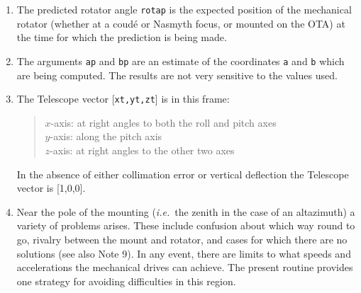 \documentclass[12pt,fleqn,twoside]{article}
\renewcommand{\_}{{\tt\char'137}}     %
\newcommand{\radec}     {$[\,\alpha,\delta\,]$}
\newcommand{\hadec}     {$[\,h,\delta\,]$}
\newcommand{\azel}      {$[\,Az,El~]$}
\begin{document}
{\begin{enumerate}
\begin{tabbing}
         \> {\tt target } \> topocentric apparent \radec \\
         \> {\tt spm1   } \> identity matrix \\
         \> {\tt sst,cst} \> \radec\ $\Rightarrow$ \hadec \\
         \> {\tt spm2   } \> topocentric \hadec\ $\Rightarrow$ {\sc Aim}
      \end{tabbing}
      \begin{tabbing}
         xxx \= xxxxxxxxxx \= \kill
         \> {\tt frame  } \> {\tt AZEL\_TOPO} \\
         \> {\tt target } \> topocentric \azel\ (N thru E) \\
         \> {\tt spm1   } \> identity matrix \\
         \> {\tt sst,cst} \> not used \\
         \> {\tt spm2   } \> topocentric \azel\ $\Rightarrow$ {\sc Aim}
      \end{tabbing}

      ICRS $\approx$ FK5 J2000 to better than 25 mas.
\item The predicted rotator angle {\tt rotap} is the expected position of
      the mechanical rotator (whether at a coud\'e or Nasmyth focus,
      or mounted on the OTA) at the time for which the prediction is
      being made.
\item The arguments {\tt ap} and {\tt bp}
      are an estimate of the coordinates
      {\tt a} and {\tt b} which are being computed.  The
      results are not very
      sensitive to the values used.
\item The {\sc Telescope} vector [{\tt xt,yt,zt}] is in this frame:
      \begin{quote}
      $x$-axis:  at right angles to both the roll and pitch axes \\
      $y$-axis:  along the pitch axis \\
      $z$-axis:  at right angles to the other two axes
      \end{quote}
      In the absence of either collimation error or vertical deflection
      the {\sc Telescope} vector is [1,0,0].
\item Near the pole of the mounting ({\it i.e.}~the zenith in the case of an
      altazimuth) a variety of problems arises.  These include
      confusion about which way round to go, rivalry between the mount
      and rotator, and cases for which there are no solutions (see also
      Note 9).  In any event, there are limits to what speeds and
      accelerations the mechanical drives can achieve.  The present
      routine provides one strategy for avoiding difficulties in this
      region.


\end{enumerate}}
\end{document}
